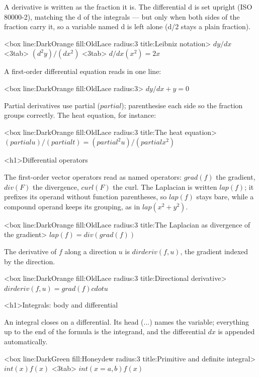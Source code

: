 \documentclass[
  margins=8,
  font=Latin Modern Roman,
  size=12,
  linespread=1.4,
  lang=en
]{scholatex}
\begin{document}
A derivative is written as the fraction it is. The differential d is
set upright (ISO 80000-2), matching the d of the integrals — but only
when both sides of the fraction carry it, so a variable named d is left
alone (d/2 stays a plain fraction).

<box line:DarkOrange fill:OldLace radius:3 title:{Leibniz notation}>{
	$dy/dx$ <3tab> $(d^2 y)/(dx^2)$ <3tab> $d/dx (x^2) = 2x$
}

A first-order differential equation reads in one line:

<box line:DarkOrange fill:OldLace radius:3>{
	$dy/dx + y = 0$
}

Partial derivatives use partial ($partial$); parenthesise each side so
the fraction groups correctly. The heat equation, for instance:

<box line:DarkOrange fill:OldLace radius:3 title:{The heat equation}>{
	$(partial u)/(partial t) = (partial^2 u)/(partial x^2)$
}

<h1>Differential operators

The first-order vector operators read as named operators: $grad(f)$ the
gradient, $div(F)$ the divergence, $curl(F)$ the curl. The Laplacian is
written $lap(f)$; it prefixes its operand without function parentheses, so
$lap(f)$ stays bare, while a compound operand keeps its grouping, as in
$lap(x^2 + y^2)$.

<box line:DarkOrange fill:OldLace radius:3 title:{The Laplacian as divergence of the gradient}>{
	$lap(f) = div(grad(f))$
}

The derivative of $f$ along a direction $u$ is $dirderiv(f, u)$, the gradient
indexed by the direction.

<box line:DarkOrange fill:OldLace radius:3 title:{Directional derivative}>{
	$dirderiv(f, u) = grad(f) cdot u$
}

<h1>Integrals: body and differential

An integral closes on a differential. Its head (...) names the
variable; everything up to the end of the formula is the integrand, and the
differential $dx$ is appended automatically.

<box line:DarkGreen fill:Honeydew radius:3 title:{Primitive and definite integral}>{
	$int(x) f(x)$ <3tab> $int(x=a, b) f(x)$
}
\end{document}
